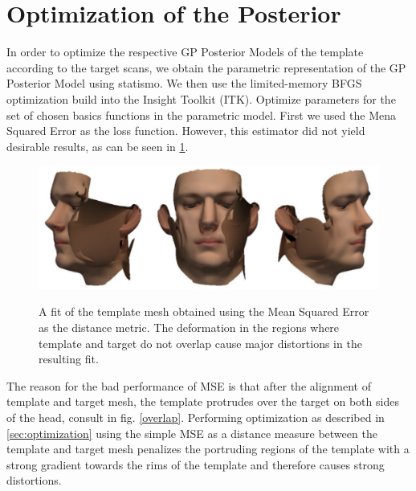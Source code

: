 \section{Optimization of the Posterior}
In order to optimize the respective GP Posterior Models of the template according to the target scans, we obtain the parametric representation of the GP Posterior Model using statismo. We then use the limited-memory BFGS optimization build into the Insight Toolkit (ITK). Optimize parameters for the set of chosen basics functions in the parametric model. First we used the Mena Squared Error as the loss function. However, this estimator did not yield desirable results, as can be seen in \ref{fig:msquaresfit}.

\begin{figure}[h!]
\centering
\includegraphics[width=.8\textwidth]{./resources/img/00029_meansquares_fit.pdf}
\label{fig:msquaresfit}
\caption{A fit of the template mesh obtained using the Mean Squared Error as the distance metric. The deformation in the regions where template and target do not overlap cause major distortions in the resulting fit.}
\end{figure}
The reason for the bad performance of MSE is that after the alignment of template and target mesh, the template protrudes over the target on both sides of the head, consult in fig. \ref{overlap}. Performing optimization as described in \ref{sec:optimization} using the simple MSE as a distance measure between the template and target mesh penalizes the portruding regions of the template with a strong gradient towards the rims of the template and therefore causes strong distortions. 

